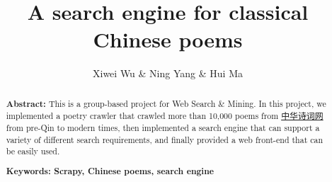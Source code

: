\documentclass{scrartcl}
\begin{document}
\title{A search engine for classical Chinese poems}
\author{Xiwei Wu \& Ning Yang \& Hui Ma}

\date{}
\maketitle

\begin{abstract}
  \textbf{Abstract:} This is a group-based project for Web Search \& Mining. In this project, we implemented a poetry crawler that crawled more than 10,000 poems from \href{https://www.shi-ci.com/}{中华诗词网} from pre-Qin to modern times, then implemented a search engine that can support a variety of different search requirements, and finally provided a web front-end that can be easily used. 

\textbf{Keywords: Scrapy, Chinese poems, search engine}
\end{abstract}






\end{document}
